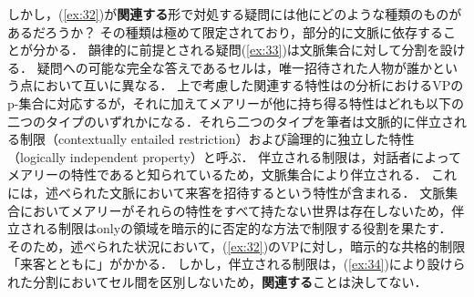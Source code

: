 \documentclass{goken}
\newcommand{\term}[2]{\textsf{#1}（#2）}
\newcommand{\ori}[1]{\noindent\textcolor[gray]{0.7}{\fontsize{8pt}{8pt}\selectfont{\textsf{(p.~#1)}}} }
\begin{document}
しかし，(\ref{ex:32})が\textbf{関連する}形で対処する疑問には他にどのような種類のものがあるだろうか？
その種類は極めて限定されており，部分的に文脈に依存することが分かる．
韻律的に前提とされる疑問(\ref{ex:33})は文脈集合に対して分割を設ける．
疑問への可能な完全な答えであるセルは，唯一招待された人物が誰かという点において互いに異なる．
上で考慮した関連する特性は\citeauthor{Rooth1985}の分析におけるVPのp-集合に対応するが，それに加えてメアリーが他に持ち得る特性はどれも以下の二つのタイプのいずれかになる．それら二つのタイプを筆者は\term{文脈的に伴立される制限}{contextually entailed restriction}および\term{論理的に独立した特性}{logically independent property}と呼ぶ．
\ori{42}
伴立される制限は，対話者によってメアリーの特性であると知られているため，文脈集合により伴立される．
これには，述べられた文脈において来客を招待するという特性が含まれる．
文脈集合においてメアリーがそれらの特性をすべて持たない世界は存在しないため，伴立される制限はonlyの領域を暗示的に否定的な方法で制限する役割を果たす．
そのため，述べられた状況において，(\ref{ex:32})のVPに対し，暗示的な共格的制限「来客とともに」がかかる．
しかし，伴立される制限は，(\ref{ex:34})により設けられた分割においてセル間を区別しないため，\textbf{関連する}ことは決してない．
\end{document}
